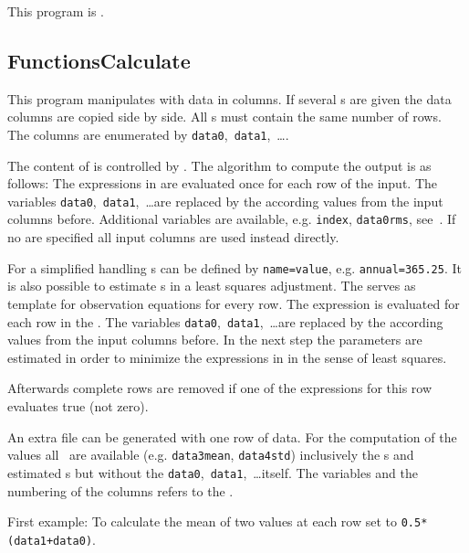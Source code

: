 This program is .
\clearpage
\subsection{FunctionsCalculate}\label{FunctionsCalculate}
This program manipulates  with data in columns.
If several s are given the data columns are copied side by side.
All s must contain the same number of rows.
The columns are enumerated by \verb|data0|,~\verb|data1|,~\ldots.

The content of  is controlled by .
The algorithm to compute the output is as follows:
The expressions in  are evaluated once for each row of the input.
The variables \verb|data0|,~\verb|data1|,~\ldots are replaced by the according values from the input columns before.
Additional variables are available, e.g. \verb|index|, \verb|data0rms|, see~.
If no  are specified all input columns are used instead directly.

For a simplified handling s can be defined by \verb|name=value|, e.g. \verb|annual=365.25|.
It is also possible to estimate s in a least squares adjustment.
The  serves as template for observation equations for every row.
The expression  is evaluated for each row in the .
The variables \verb|data0|,~\verb|data1|,~\ldots are replaced by the according values from the input columns before.
In the next step the parameters are estimated in order to minimize the expressions in 
in the sense of least squares.

Afterwards complete rows are removed if one of the  expressions for this row evaluates true (not zero).

An extra  file can be generated with one row of data. For the computation of the  values
all~ are available (e.g. \verb|data3mean|, \verb|data4std|)
inclusively the s and estimated s but without the \verb|data0|,~\verb|data1|,~\ldots itself.
The variables and the numbering of the columns refers to the .

First example: To calculate the mean of two values at each row set  to \verb|0.5*(data1+data0)|.

